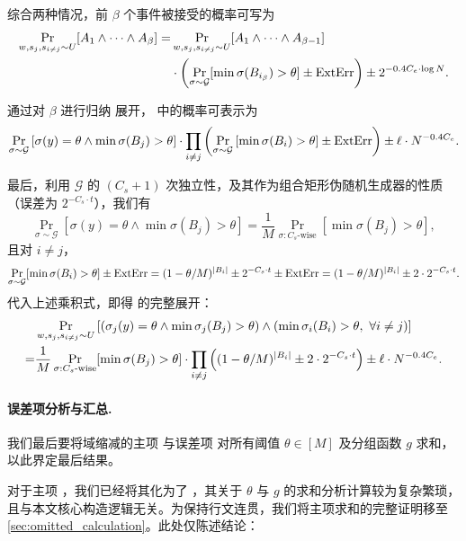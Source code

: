 综合两种情况，前 $\beta$ 个事件被接受的概率可写为
\begin{align*}
    \Pr_{w, s_j, s_{i \ne j} \sim U}[A_1 \wedge \cdots \wedge A_\beta] = & \Pr_{w, s_j, s_{i \ne j} \sim U}[A_1 \wedge \cdots \wedge A_{\beta - 1}] \\
     & \cdot \left( \Pr_{\sigma \sim \mathcal{G}}[\min \sigma(B_{i_\beta}) > \theta] \pm \mathrm{ExtErr} \right) \pm 2^{-0.4 C_e \cdot \log N}.
\end{align*}

通过对 $\beta$ 进行归纳 展开， 中的概率可表示为
$$
\Pr_{\sigma \sim \mathcal{G}}\left[ \sigma(y) = \theta \wedge \min \sigma(B_j) > \theta \right] \cdot \prod_{i \ne j} \left( \Pr_{\sigma \sim \mathcal{G}}\left[ \min \sigma(B_i) > \theta \right] \pm \mathrm{ExtErr} \right) \pm \ell \cdot N^{-0.4 C_e}. 
$$

最后，利用 $\mathcal{G}$ 的 $(C_s + 1)$ 次独立性，及其作为组合矩形伪随机生成器的性质（误差为 $2^{-C_s \cdot t}$），我们有
$$
\Pr_{\sigma \sim \mathcal{G}}[\sigma(y) = \theta \wedge \min \sigma(B_j) > \theta] = \frac{1}{M} \Pr_{\sigma : C_s\text{-wise}}[\min \sigma(B_j) > \theta],
$$
且对 $i \ne j$，
$$
\Pr_{\sigma \sim \mathcal{G}}[\min \sigma(B_i) > \theta] \pm \mathrm{ExtErr} = (1 - \theta / M)^{|B_i|} \pm 2^{-C_s \cdot t} \pm \mathrm{ExtErr} = (1 - \theta / M)^{|B_i|} \pm 2 \cdot 2^{-C_s \cdot t}.
$$
代入上述乘积式，即得  的完整展开：
\begin{align}
      & \Pr_{w, s_j, s_{i \ne j} \sim U}\left[ (\sigma_j(y) = \theta \wedge \min \sigma_j(B_j) > \theta) \wedge (\min \sigma_i(B_i) > \theta,\ \forall i \ne j) \right] \notag \\
    = & \frac{1}{M} \Pr_{\sigma : C_s\text{-wise}}[\min \sigma(B_j) > \theta] \cdot \prod_{i \ne j} \left( (1 - \theta / M)^{|B_i|} \pm 2 \cdot 2^{-C_s \cdot t} \right) \pm \ell \cdot N^{-0.4 C_e}. \label{eq:final_product_expansion}
\end{align}

\paragraph{误差项分析与汇总.}

我们最后要将域缩减的主项  与误差项  对所有阈值 $\theta \in [M]$ 及分组函数 $g$ 求和，以此界定最后结果。

对于主项 ，我们已经将其化为了 ，其关于 $\theta$ 与 $g$ 的求和分析计算较为复杂繁琐，且与本文核心构造逻辑无关。为保持行文连贯，我们将主项求和的完整证明移至 \ref{sec:omitted_calculation}。此处仅陈述结论：

